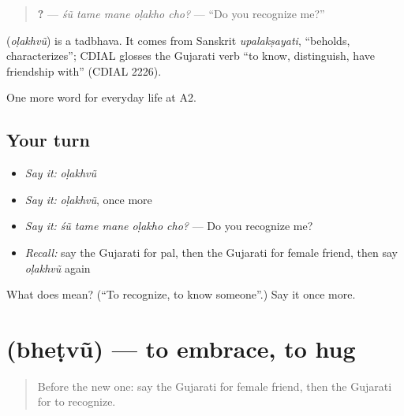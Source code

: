 \begin{quote}
\textbf{    ?} — \emph{śũ tame mane oḷakho cho?} — \textquotedblleft{}Do you recognize me?\textquotedblright{}
\end{quote}

\begin{cousinweb}
\textbf{} (\emph{oḷakhvũ}) is a tadbhava. It comes from Sanskrit \emph{upalakṣayati}, \textquotedblleft{}beholds, characterizes\textquotedblright{}; CDIAL glosses the Gujarati verb \textquotedblleft{}to know, distinguish, have friendship with\textquotedblright{} (CDIAL 2226).
\end{cousinweb}

\begin{grammarlens}[title={What you've built}]
One more word for everyday life at A2.
\end{grammarlens}

\subsection*{Your turn}
\begin{itemize}
\raggedright
  \item \emph{Say it:} \emph{oḷakhvũ}
  \item \emph{Say it:} \emph{oḷakhvũ}, once more
  \item \emph{Say it:} \emph{śũ tame mane oḷakho cho?} — Do you recognize me?
  \item \emph{Recall:} say the Gujarati for pal, then the Gujarati for female friend, then say \emph{oḷakhvũ} again
\end{itemize}

\begin{tcolorbox}[breakable,colback=teal!4,colframe=teal!35!black,title={Before you move on}]
What does  mean? (\textquotedblleft{}To recognize, to know someone\textquotedblright{}.) Say it once more.
\end{tcolorbox}
\section[\texorpdfstring{\gu{ભેટવું} (bheṭvũ)}{ભેટવું (bheṭvũ)}]{ (bheṭvũ) — to embrace, to hug}

\label{lesson:GU-C264-bhetvu}



\begin{quote}
Before the new one: say the Gujarati for female friend, then the Gujarati for to recognize.
\end{quote}

